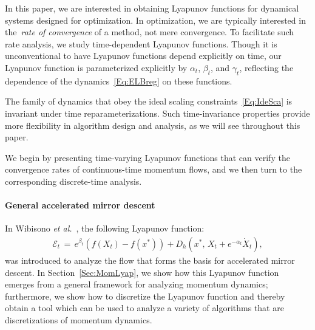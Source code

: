 \documentclass[11pt]{article}
\theoremstyle{plain}
\newcommand{\E}{{\mathcal E}}
\begin{document}
In this paper, we are interested in obtaining Lyapunov functions for dynamical systems designed for optimization.  In optimization, we are typically interested in the~\emph{rate of convergence} of a method, not mere convergence.  To facilitate such rate analysis, we study time-dependent Lyapunov functions.  Though it is unconventional to have Lyapunov functions depend explicitly on time, our Lyapunov function is parameterized explicitly by $\alpha_t$, $\beta_t$, and $\gamma_t$, reflecting the dependence of the dynamics~\eqref{Eq:ELBreg} on these functions.

The family of dynamics that obey the ideal scaling constraints~\eqref{Eq:IdeSca} is invariant under time reparameterizations.  Such time-invariance properties provide more flexibility in algorithm design and analysis, as we will see throughout this paper.

We begin by presenting time-varying Lyapunov functions that can verify the convergence rates of continuous-time momentum flows, and we then turn to the corresponding discrete-time analysis.

\paragraph{General accelerated mirror descent} In Wibisono {\em et al.}~\cite{Acceleration}, the following Lyapunov function:
\begin{align}\label{Eq:E}
\E_t \,=\, e^{\beta_t} (f(X_t)-f(x^*)) + D_h\left(x^*, \, X_t + e^{-\alpha_t} \dot X_t\right),
\end{align}
was introduced to analyze the flow that forms the basis for accelerated mirror descent.
In Section~\ref{Sec:MomLyap}, we show how this Lyapunov function emerges from a general framework for analyzing momentum dynamics; furthermore, we show how to discretize the Lyapunov function and thereby obtain a tool which can be used to analyze a variety of algorithms that are discretizations of momentum dynamics.
%
%
%
\end{document}
